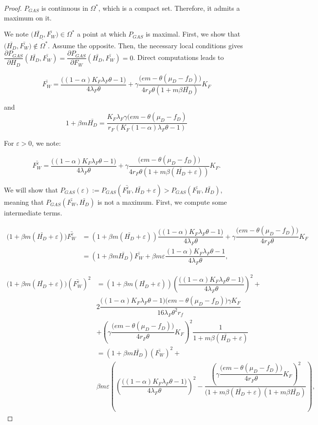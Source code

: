 \documentclass{article}
\newcommand{\lfw}{\lambda_{F}}
\newcommand{\lfw}{\lambda_{F}}
\renewcommand{\epsilon}{\varepsilon}
\begin{document}
\begin{proof}
$P_{GAS}$ is continuous in $\Omega^*$, which is a compact set. Therefore, it admits a maximum on it.

\bigskip
We note $\Big(\bar{H_D}, \bar{F_W}\Big) \in \Omega^* $ a point at which $P_{GAS}$ is maximal. First, we show that $\Big(\bar{H_D}, \bar{F_W}\Big) \notin \mathring{\Omega^*}$. Assume the opposite. Then, the necessary local conditions gives  $\dfrac{\partial P_{GAS}}{\partial H_D}(\bar{H_D}, \bar{F_W}) = \dfrac{\partial P_{GAS}}{\partial F_W}(\bar{H_D}, \bar{F_W}) = 0$. 
Direct computations leads to

$$
\bar{F_W} = \dfrac{ \Big((1-\alpha)K_F \lfw \theta - 1\Big)}{4 \lfw \theta} + \gamma \dfrac{\Big(em - \theta (\mu_D - f_D)\Big)}{4 r_F \theta (1 + m \beta \bar{H_D})} K_F
$$

and 
$$
1 + \beta m \bar{H_D} = \dfrac{K_F \lfw \gamma(em - \theta (\mu_D - f_D)}{r_F (K_F(1-\alpha) \lfw \theta - 1)}
$$

For $\epsilon > 0$, we note: 

$$ 
\bar{F_W^\epsilon} =\dfrac{ \Big((1-\alpha)K_F \lfw \theta - 1\Big)}{4 \lfw \theta} + \gamma \dfrac{\Big(em - \theta (\mu_D - f_D)\Big)}{4 r_F \theta (1 + m \beta (\bar{H_D} + \epsilon))} K_F.$$

We will show that $P_{GAS}(\epsilon) := P_{GAS}(\bar{F_W^\epsilon}, \bar{H_D} + \epsilon) > P_{GAS}(\bar{F_W},\bar{H_D})$, meaning that $P_{GAS}(\bar{F_W},\bar{H_D})$ is not a maximum. First, we compute some intermediate terms.

\begin{align*}
\Big(1 + \beta m ( \bar{H_D} + \epsilon)\Big) \bar{F_W^\epsilon} &= (1+\beta m (\bar{H_D} + \epsilon))\dfrac{ \Big((1-\alpha)K_F \lfw \theta - 1\Big)}{4 \lfw \theta} + \gamma \dfrac{\Big(em - \theta (\mu_D - f_D)\Big)}{4 r_F \theta} K_F \\
& = (1 + \beta m  \bar{H_D}) \bar{F_W} + \beta m \epsilon \dfrac{(1-\alpha)K_F \lfw \theta - 1}{4 \lfw \theta} ,
\end{align*}


\begin{align*}
\Big(1 + \beta m ( \bar{H_D} + \epsilon)\Big) (\bar{F_W^\epsilon})^2 &= (1+\beta m (\bar{H_D} + \epsilon)) \left(\dfrac{ \Big((1-\alpha)K_F \lfw \theta - 1\Big)}{4 \lfw \theta} \right)^2 + \\& 2 \dfrac{\Big((1-\alpha)K_F \lfw \theta - 1\Big)\Big(em - \theta (\mu_D - f_D)\Big) \gamma K_F}{16 \lfw \theta^2 r_f} \\ & + \left(\gamma \dfrac{\Big(em - \theta (\mu_D - f_D)\Big)}{4 r_F \theta} K_F \right)^2 \dfrac{1}{ 1 + m \beta (\bar{H_D} + \epsilon)} \\
&= (1 + \beta m \bar{H_D}) (\bar{F_W})^2 + \\ & \beta m \epsilon \left(\left(\dfrac{ \Big((1-\alpha)K_F \lfw \theta - 1\Big)}{4 \lfw \theta} \right)^2 -  \dfrac{\left(\gamma \dfrac{\Big(em - \theta (\mu_D - f_D)\Big)}{4 r_F \theta} K_F \right)^2}{ (1 + m \beta (\bar{H_D} + \epsilon)(1 + m \beta \bar{H_D})} \right),
\end{align*}


\end{proof}
\end{document}
